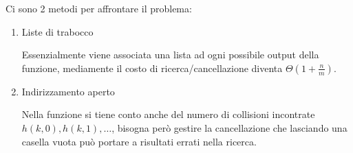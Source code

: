 \documentclass{article}
\begin{document}
\noindent Ci sono 2 metodi per affrontare il problema:
\begin{enumerate}
    \item Liste di trabocco

    Essenzialmente viene associata una lista ad ogni possibile output della funzione, mediamente il costo di ricerca/cancellazione diventa $\Theta(1+\frac{n}{m})$.

    \item Indirizzamento aperto

    Nella funzione si tiene conto anche del numero di collisioni incontrate $h(k,0),h(k,1),\ldots$, bisogna però gestire la cancellazione che lasciando una casella vuota può portare a risultati errati nella ricerca.
    
\end{enumerate}
\end{document}
